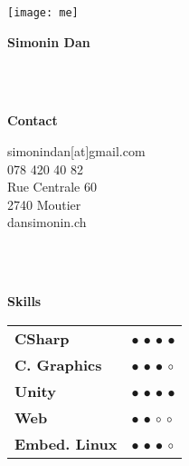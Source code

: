 \texttt{[image: me]}

\begin{center}
    \textbf{Simonin Dan}
\end{center}

\\
\\

\begin{center}
    \textbf{Contact}
\end{center}

simonindan[at]gmail.com \\
078 420 40 82 \\
Rue Centrale 60 \\
2740 Moutier \\
dansimonin.ch

\\
\\

\begin{center}
    \textbf{Skills}
\end{center}

\begin{tabular}{@{}p{}l}
    \textbf{CSharp} & $\bullet$ $\bullet$ $\bullet$ $\bullet$ \\
    \textbf{C. Graphics} & $\bullet$ $\bullet$ $\bullet$ $\circ$ \\
    \textbf{Unity} & $\bullet$ $\bullet$ $\bullet$ $\bullet$ \\
    \textbf{Web} & $\bullet$ $\bullet$ $\circ$ $\circ$ \\
    \textbf{Embed. Linux} & $\bullet$ $\bullet$ $\bullet$ $\circ$
\end{tabular}